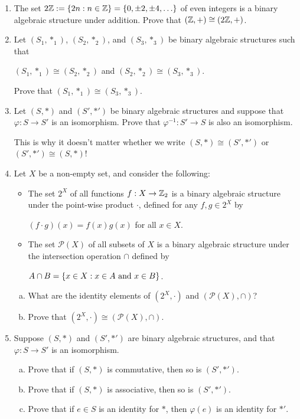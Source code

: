 \documentclass[11pt,fleqn,dvipsnames,usenames]{article}
\newcommand{\p}{\noindent}
\begin{document}
\p {\huge \S4.2 Problems}
\vsp

\begin{enumerate}[1.]
\item The set $2\mathbb{Z} := \left\{2n:n\in\mathbb{Z}\right\} = \left\{0, \pm 2, \pm 4,\ldots\right\}$ of even integers is a binary algebraic structure under addition.  Prove that $(\mathbb{Z},+)\cong (2\mathbb{Z},+)$.
%
\item Let $(S_{1},*_{1})$, $(S_{2}, *_{2})$, and $(S_{3}, *_{3})$ be binary algebraic structures such that
\begin{center}
$(S_{1},*_{1})\cong(S_{2},*_{2})$ and $(S_{2},*_{2})\cong(S_{3},*_{3})$.
\end{center}
Prove that $(S_{1},*_{1})\cong(S_{3},*_{3})$.
%
\item Let $(S,*)$ and $(S',*')$ be binary algebraic structures and suppose that $\varphi:S\to S'$ is an isomorphism.  Prove that $\varphi^{-1}:S'\to S$ is also an isomorphism.

\note This is why it doesn't matter whether we write $(S,*)\cong (S',*')$ or $(S',*')\cong (S,*)$!
%
\item Let $X$ be a non-empty set, and consider the following:
\begin{itemize}
\item The set $2^{X}$ of all functions $f:X\to\mathbb{Z}_{2}$ is a binary algebraic structure under the point-wise product $\cdot$, defined for any $f,g\in 2^{X}$ by
\begin{center}
$(f \cdot g)(x) = f(x)g(x)$ for all $x\in X$.
\end{center}
\item The set $\mathcal{P}(X)$ of all subsets of $X$ is a binary algebraic structure under the intersection operation $\cap$ defined by
\begin{center}
$A\cap B = \left\{x\in X:x\in A\text{ and }x\in B\right\}$.
\end{center}
\end{itemize}
\begin{enumerate}[(a)]
\item What are the identity elements of $(2^{X}, \cdot)$ and $(\mathcal{P}(X), \cap)$?
\item Prove that $(2^{X}, \cdot)\cong (\mathcal{P}(X), \cap)$.
\end{enumerate}
%
\item Suppose $(S,*)$ and $(S',*')$ are binary algebraic structures, and that $\varphi:S\to S'$ is an isomorphism.
\begin{enumerate}[(a)]
\item Prove that if $(S,*)$ is commutative, then so is $(S',*')$.
\item Prove that if $(S,*)$ is associative, then so is $(S',*')$.
\item Prove that if $e\in S$ is an identity for $*$, then $\varphi(e)$ is an identity for $*'$.
\end{enumerate}
\end{enumerate}
\vsp
\end{document}
